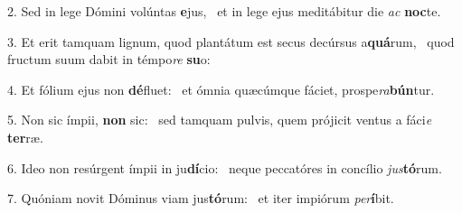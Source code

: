 2. Sed in lege Dómini volúntas \textbf{e}jus, \ast\  et in lege ejus meditábitur die \textit{ac} \textbf{noc}te.\

3. Et erit tamquam lignum, quod plantátum est secus decúrsus a\textbf{quá}rum, \ast\  quod fructum suum dabit in témpo\textit{re} \textbf{su}o:\

4. Et fólium ejus non \textbf{dé}fluet: \ast\  et ómnia quæcúmque fáciet, prospe\textit{ra}\textbf{bún}tur.\

5. Non sic ímpii, \textbf{non} sic: \ast\  sed tamquam pulvis, quem prójicit ventus a fáci\textit{e} \textbf{ter}ræ.\

6. Ideo non resúrgent ímpii in ju\textbf{dí}cio: \ast\  neque peccatóres in concílio \textit{jus}\textbf{tó}rum.\

7. Quóniam novit Dóminus viam jus\textbf{tó}rum: \ast\  et iter impiórum \textit{per}\textbf{í}bit.\

